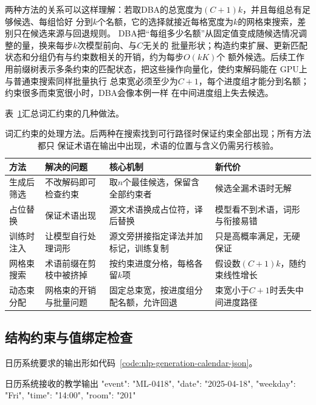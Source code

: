 两种方法的关系可以这样理解：若取DBA的总宽度为$(C+1)k$，并且每组总有足够候选、每组恰好
分到$k$个名额，它的选择就接近每格宽度为$k$的网格束搜索，差别只在候选来源与回退规则。
DBA把“每组多少名额”从固定值变成随候选情况调整的量，换来每步$k$次模型前向、与$C$无关的
批量形状；构造约束扩展、更新匹配状态和分组仍有与约束数相关的开销，约为每步$O(kK)$个
额外候选。后续工作用前缀树表示多条约束的匹配状态，把这些操作向量化，使约束解码能在
GPU上与普通束搜索同样批量执行
总束宽必须至少为$C+1$，每个进度组才能分到名额；约束很多而束宽很小时，DBA会像本例一样
在中间进度组上失去候选。

表~\ref{tab:nlp-generation-lexical-methods}汇总词汇约束的几种做法。

\begin{table}[htbp]
  \centering
  \small
  \renewcommand{\tabularxcolumn}[1]{>{\raggedright\arraybackslash}p{#1}}
  \begin{tabularx}{\linewidth}{@{}>{\raggedright\arraybackslash}p{22mm}XXX@{}}
    \toprule
    方法 & 解决的问题 & 核心机制 & 新代价\\
    \midrule
    生成后筛选 & 不改解码即可检查约束 & 取$n$个最佳候选，保留含全部约束者 & 候选全漏术语时无解\\
    占位替换 & 保证术语出现 & 源文术语换成占位符，译后替换 & 模型看不到术语，词形与衔接易错\\
    训练时注入 & 让模型自行处理词形 & 源文旁拼接指定译法并加标记，训练复制 & 只是高概率满足，无硬保证\\
    网格束搜索 & 术语前缀在剪枝中被挤掉 & 按约束进度分格，每格各留$k$项 & 假设数$(C+1)k$，随约束线性增长\\
    动态束分配 & 网格束的开销与批量问题 & 固定总束宽，按进度组分配名额，允许回退 & 束宽小于$C+1$时丢失中间进度路径\\
    \bottomrule
  \end{tabularx}
  \caption{词汇约束的处理方法。后两种在搜索找到可行路径时保证约束全部出现；所有方法都只
  保证术语在输出中出现，术语的位置与含义仍需另行核验。}
  \label{tab:nlp-generation-lexical-methods}
\end{table}

\subsection{结构约束与值绑定检查}
\label{sec:nlp-generation-grammar}

日历系统要求的输出形如代码~\ref{code:nlp-generation-calendar-json}。

\begin{codeblock}[label={code:nlp-generation-calendar-json}]{日历系统接收的教学输出}
{"event": "ML-0418", "date": "2025-04-18",
 "weekday": "Fri", "time": "14:00", "room": "201"}
\end{codeblock}

